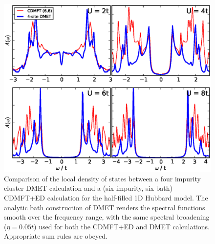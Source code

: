 \documentclass[aps,twocolumn,nobibnotes]{revtex4}
\begin{document}
\begin{figure}
\begin{center}
    \vspace{-2mm}
\includegraphics[scale=0.425]{1D_Hub_Spectra.eps}
\end{center}
    \vspace{-5mm}
\caption{Comparison of the local density of states between a four impurity cluster DMET calculation and a
(six impurity, six bath) CDMFT+ED calculation for the half-filled 1D Hubbard model. The analytic bath construction
of DMET renders the spectral functions smooth over the frequency range, with the same spectral broadening ($\eta=0.05t$) used for
both the CDMFT+ED and DMET calculations. Appropriate sum rules are obeyed.}
\label{1D_DOS}
\end{figure}
\end{document}
